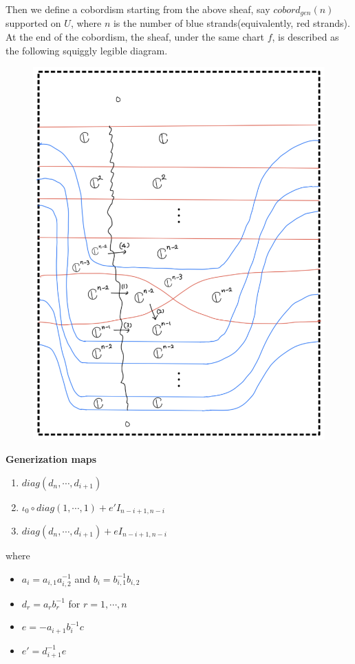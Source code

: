 Then we define a cobordism starting from the above sheaf, say $cobord_{gen}(n)$ supported on $U$, where $n$ is the number of blue strands(equivalently, red strands). At the end of the cobordism, the sheaf, under the same chart $f$, is described as the following squiggly legible diagram. 
\begin{figure}[H]
    \centering
    \includegraphics[scale = 0.95]{diagrams/cobord_gen/15.png}
    \caption{}
    \label{fig:your-label}
\end{figure}
\pagebreak
\textbf{Generization maps}
\begin{enumerate}[label = (\arabic*)]
\item $diag(d_n,\cdots,d_{i+1})$

\item $\iota_0 \circ diag(1,\cdots,1) + e' I_{n-i+1,n-i}$

\item $diag(d_n,\cdots,d_{i+1}) + e I_{n-i+1,n-i}$
\end{enumerate}
where
\begin{itemize}
\item $a_i = a_{i,1}a_{i,2}^{-1}$ and $b_i = b_{i,1}^{-1}b_{i,2}$
\item $d_r = a_r b_r^{-1}$ for $r=1,\cdots,n$
\item $e = -a_{i+1}b_i^{-1}c$
\item $e' = d_{i+1}^{-1}e$
\end{itemize}
